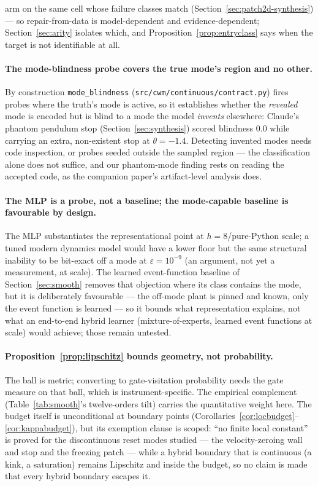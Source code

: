 \documentclass[11pt]{article}
\theoremstyle{definition}
\theoremstyle{remark}
\begin{document}
arm on the same cell whose failure classes match (Section~\ref{sec:patch2d-synthesis}) --- so repair-from-data is model-dependent and evidence-dependent; Section~\ref{sec:arity} isolates which, and Proposition~\ref{prop:entryclass} says when the target is not identifiable at all.

\paragraph{The mode-blindness probe covers the true mode's region and no other.} By construction \texttt{mode\_blindness} (\texttt{src/cwm/continuous/contract.py}) fires probes where the truth's mode is active, so it establishes whether the \emph{revealed} mode is encoded but is blind to a mode the model \emph{invents} elsewhere: Claude's phantom pendulum stop (Section~\ref{sec:synthesis}) scored blindness 0.0 while carrying an extra, non-existent stop at $\theta = -1.4$. Detecting invented modes needs code inspection, or probes seeded outside the sampled region --- the classification alone does not suffice, and our phantom-mode finding rests on reading the accepted code, as the companion paper's artifact-level analysis does.

\paragraph{The MLP is a probe, not a baseline; the mode-capable baseline is favourable by design.} The MLP substantiates the representational point at $h{=}8$/pure-Python scale; a tuned modern dynamics model would have a lower floor but the same structural inability to be bit-exact off a mode at $\varepsilon = 10^{-9}$ (an argument, not yet a measurement, at scale). The learned event-function baseline of Section~\ref{sec:smooth} removes that objection where its class contains the mode, but it is deliberately favourable --- the off-mode plant is pinned and known, only the event function is learned --- so it bounds what representation explains, not what an end-to-end hybrid learner (mixture-of-experts, learned event functions at scale) would achieve; those remain untested.

\paragraph{Proposition~\ref{prop:lipschitz} bounds geometry, not probability.} The ball is metric; converting to gate-visitation probability needs the gate measure on that ball, which is instrument-specific. The empirical complement (Table~\ref{tab:smooth}'s twelve-orders tilt) carries the quantitative weight here. The budget itself is unconditional at boundary points (Corollaries~\ref{cor:locbudget}--\ref{cor:kappabudget}), but its exemption clause is scoped: ``no finite local constant'' is proved for the discontinuous reset modes studied --- the velocity-zeroing wall and stop and the freezing patch --- while a hybrid boundary that is continuous (a kink, a saturation) remains Lipschitz and inside the budget, so no claim is made that every hybrid boundary escapes it.
\end{document}
